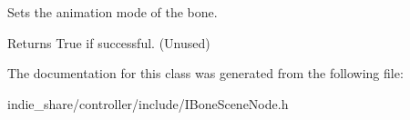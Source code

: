 Sets the animation mode of the bone. 

\begin{DoxyReturn}{Returns}
True if successful. (Unused) 
\end{DoxyReturn}


The documentation for this class was generated from the following file\+:\begin{DoxyCompactItemize}
\item 
indie\+\_\+share/controller/include/I\+Bone\+Scene\+Node.\+h\end{DoxyCompactItemize}
